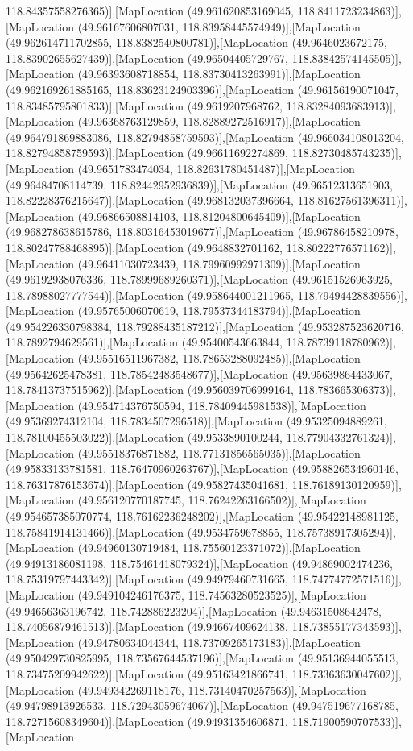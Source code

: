 118.84357558276365)],[MapLocation (49.961620853169045, 118.8411723234863)],[MapLocation (49.96167606807031, 118.83958445574949)],[MapLocation (49.962614711702855, 118.8382540800781)],[MapLocation (49.9646023672175, 118.83902655627439)],[MapLocation (49.96504405729767, 118.83842574145505)],[MapLocation (49.96393608718854, 118.83730413263991)],[MapLocation (49.962169261885165, 118.83623124903396)],[MapLocation (49.96156190071047, 118.83485795801833)],[MapLocation (49.9619207968762, 118.83284093683913)],[MapLocation (49.96368763129859, 118.82889272516917)],[MapLocation (49.964791869883086, 118.82794858759593)],[MapLocation (49.966034108013204, 118.82794858759593)],[MapLocation (49.96611692274869, 118.82730485743235)],[MapLocation (49.9651783474034, 118.82631780451487)],[MapLocation (49.96484708114739, 118.82442952936839)],[MapLocation (49.96512313651903, 118.82228376215647)],[MapLocation (49.968132037396664, 118.81627561396311)],[MapLocation (49.96866508814103, 118.81204800645409)],[MapLocation (49.968278638615786, 118.80316453019677)],[MapLocation (49.96786458210978, 118.80247788468895)],[MapLocation (49.9648832701162, 118.80222776571162)],[MapLocation (49.96411030723439, 118.79960992971309)],[MapLocation (49.96192938076336, 118.78999689260371)],[MapLocation (49.96151526963925, 118.78988027777544)],[MapLocation (49.958644001211965, 118.79494428839556)],[MapLocation (49.95765006070619, 118.79537344183794)],[MapLocation (49.954226330798384, 118.79288435187212)],[MapLocation (49.953287523620716, 118.7892794629561)],[MapLocation (49.95400543663844, 118.78739118780962)],[MapLocation (49.95516511967382, 118.78653288092485)],[MapLocation (49.95642625478381, 118.78542483548677)],[MapLocation (49.95639864433067, 118.78413737515962)],[MapLocation (49.956039706999164, 118.783665306373)],[MapLocation (49.954714376750594, 118.78409445981538)],[MapLocation (49.95369274312104, 118.7834507296518)],[MapLocation (49.95325094889261, 118.78100455503022)],[MapLocation (49.9533890100244, 118.77904332761324)],[MapLocation (49.95518376871882, 118.77131856565035)],[MapLocation (49.95833133781581, 118.76470960263767)],[MapLocation (49.958826534960146, 118.76317876153674)],[MapLocation (49.95827435041681, 118.76189130120959)],[MapLocation (49.956120770187745, 118.76242263166502)],[MapLocation (49.954657385070774, 118.76162236248202)],[MapLocation (49.95422148981125, 118.75841914131466)],[MapLocation (49.9534759678855, 118.75738917305294)],[MapLocation (49.94960130719484, 118.75560123371072)],[MapLocation (49.94913186081198, 118.75461418079324)],[MapLocation (49.94869002474236, 118.75319797443342)],[MapLocation (49.94979460731665, 118.74774772571516)],[MapLocation (49.949104246176375, 118.74563280523525)],[MapLocation (49.94656363196742, 118.742886223204)],[MapLocation (49.94631508642478, 118.74056879461513)],[MapLocation (49.94667409624138, 118.73855177343593)],[MapLocation (49.94780634044344, 118.73709265173183)],[MapLocation (49.950429730825995, 118.73567644537196)],[MapLocation (49.95136944055513, 118.73475209942622)],[MapLocation (49.95163421866741, 118.73363630047602)],[MapLocation (49.949342269118176, 118.73140470257563)],[MapLocation (49.94798913926533, 118.72943059674067)],[MapLocation (49.947519677168785, 118.72715608349604)],[MapLocation (49.94931354606871, 118.71900590707533)],[MapLocation 